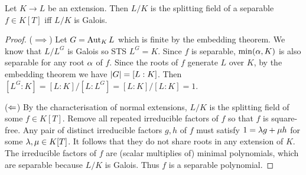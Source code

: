 \documentclass{article}
\begin{document}
\begin{prop}
  
  Let $K \to L$ be an extension.
  Then $L / K$ is the splitting field of a separable $f \in K[T]$
  iff $L / K$ is Galois.
\end{prop}
\begin{proof}
  ($\implies$)
  Let $G = \operatorname{Aut}_K L$ which is finite by the embedding theorem.
  We know that $L / L^G$ is Galois so STS $L^G = K$.
  Since $f$ is separable,
  $\min(\alpha , K)$ is also separable for any root $\alpha$ of $f$.
  Since the roots of $f$ generate $L$ over $K$,
  by the embedding theorem we have $\left\vert G \right\vert = [L : K]$.
  Then $[L^G : K] = [L : K] / [L : L^G] = [L : K] / [L : K] = 1$.

  ($\Leftarrow$)
  By the characterisation of normal extensions,
  $L / K$ is the splitting field of some $f \in K[T]$.
  Remove all repeated irreducible factors of $f$ so that $f$ is square-free.
  Any pair of distinct irreducible factors $g , h$ of $f$ 
  must satisfy $1 = \lambda g + \mu h$ for some $\lambda , \mu \in K[T]$.
  It follows that they do not share roots in any extension of $K$.
  The irreducible factors of $f$ are (scalar multiplies of) minimal polynomials,
  which are separable because $L / K$ is Galois.
  Thus $f$ is a separable polynomial.
\end{proof}
\end{document}
